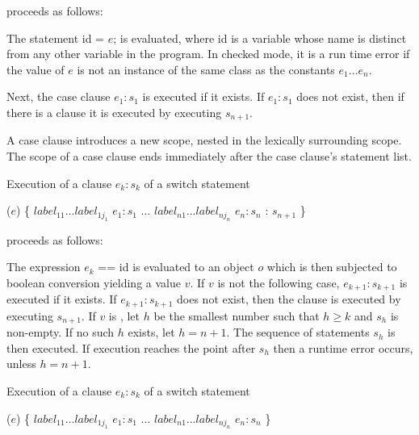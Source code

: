 \documentclass{article}
\newcommand{\code}[1]{{\sf #1}}
\begin{document}
proceeds as follows:

\LMHash{}
The statement \code{\VAR{} id = $e$;} is evaluated, where \code{id} is a variable whose name is distinct from any other variable in the program. In checked mode, it is a run time error if the value of $e$ is not an instance of the same class as the constants $e_1 \ldots e_n$. 


\LMHash{}
Next, the case clause \CASE{} $e_{1}: s_{1}$ is executed if it exists. If \CASE{} $e_{1}: s_{1}$ does not exist, then if there is a  \DEFAULT{} clause it is executed by executing $s_{n+1}$.

\LMHash{}
A case clause introduces a new scope, nested in the lexically surrounding scope. The scope of a case clause ends immediately after the case clause's statement list.

\LMHash{}
Execution of a \CASE{} clause \CASE{} $e_{k}: s_{k}$ of a  switch statement  

\begin{dartCode}
\SWITCH{} ($e$) \{ 
   \CASE{} $label_{11} \ldots label_{1j_1}$ $e_1: s_1$ 
   $\ldots$  
   \CASE{} $label_{n1} \ldots label_{nj_n}$ $e_n: s_n$ 
   \DEFAULT{}: $s_{n+1}$ 
\}
\end{dartCode}

proceeds as follows:

\LMHash{}
The expression \code{$e_k$ == id} is evaluated to an object $o$ which is then subjected to boolean conversion yielding a value $v$. 
If $v$ is not  \TRUE{} the following case,  \CASE{} $e_{k+1}: s_{k+1}$ is executed if it exists. If  \CASE{} $e_{k+1}: s_{k+1}$ does not exist, then the \DEFAULT{} clause is executed by executing $s_{n+1}$.
If $v$ is \TRUE{},   let $h$ be the smallest number such that $h \ge k$ and $s_h$ is non-empty. If no such $h$ exists, let $h = n + 1$. The  sequence of statements $s_h$ is then executed.
If execution reaches the point after $s_h$  then  a runtime error occurs, unless $h = n+1$.

\LMHash{}
Execution of a \CASE{} clause \CASE{} $e_{k}: s_{k}$ of a  switch statement  

\begin{dartCode}
\SWITCH{} ($e$) \{ 
   \CASE{} $label_{11} \ldots label_{1j_1}$ $e_1: s_1$
   $\ldots$  
   \CASE{} $label_{n1} \ldots label_{nj_n}$ $e_n: s_n$ 
\}
\end{dartCode}
\end{document}
